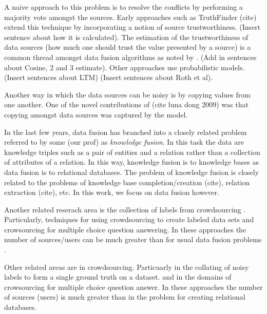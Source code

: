 \documentclass{acm_proc_article-sp}
\begin{document}
A naive approach to this problem is to resolve the conflicts by performing a majority vote amongst the sources. Early approaches such as {\sc TruthFinder} (cite)  extend this technique by incorporating a notion of source trustworthiness. (Insert sentence about how it is calculated). The estimation of the trustworthiness of data sources (how much one should trust the value presented by a source)  is a common thread amongst data fusion algorithms as noted by \cite{li:truth} \cite{waguih:truth}. (Add in sentences about Cosine, 2 and 3 estimate). Other approaches use probabilistic models. (Insert sentences about LTM) (Insert sentences about Roth et al).


Another way in which the data sources can be noisy is by copying values from one another. One of the novel contributions of (cite luna dong 2009) was that copying amongst data sources was captured by the model. 

In the last few years, data fusion has branched into a closely related problem referred to by some \cite{dong:data}(our prof) as \emph{knowledge fusion}. In this task the data are knowledge triples such as a pair of entities and a relation rather than a collection of attributes of a relation. In this way, knowledge fusion is to knowledge bases as data fusion is to relational databases. The problem of knowledge fusion is closely related to the problems of knowledge base completion/creation (cite), relation extraction (cite), etc. In this work, we focus on data fusion however.

Another related reserach area is the collection of labels from crowdsourcing \cite{nguyen:minimizing}. Particularly, techniques for using crowdsourcing to create labeled data sets and crowsourcing for multiple choice question answering. In these approaches the number of sources/users can be much greater than for usual data fusion problems \cite{li:truth} \cite{nguyen:minimizing}.



Other related areas are in crowdsourcing. Particuarly in the collating of noisy labels to form a single ground truth on a dataset. and in the domains of crowsourcing for multiple choice question answer. In these approaches the number of sources (users) is much greater than in the problem for creating relational databases.  


  

\balancecolumns
\end{document}
